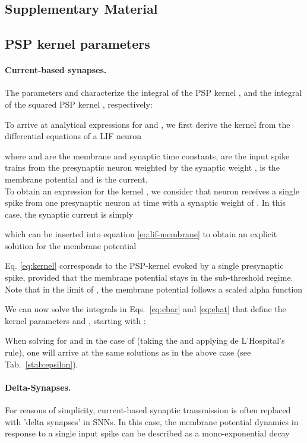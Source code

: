 \documentclass[11pt,a4paper]{article}
\begin{document}
\begin{refsection}
\section*{Supplementary Material}



\subsection{PSP kernel parameters} 
\label{sup:kernel}

\paragraph{Current-based synapses.} 
The parameters  and
 characterize the integral of the \ac{PSP} kernel , and the integral of the squared \ac{PSP} kernel , respectively:
 
To arrive at analytical expressions for  and
, we first derive the kernel  from the differential equations of a \ac{LIF} neuron \citep{Gerstner2002}

where  and  are the membrane and synaptic time constants,  are the input spike trains from the presynaptic neuron  weighted by the synaptic weight ,  is the membrane potential and  is the current.\\
To obtain an expression for the kernel , we consider that neuron
 receives a single spike from one presynaptic neuron  at time  with
a synaptic weight of . In this case, the synaptic current is simply

which can be inserted into equation \eqref{eq:lif-membrane} to obtain an
explicit solution for the membrane potential

Eq. \eqref{eq:kernel} corresponds to the \ac{PSP}-kernel  evoked
by a single presynaptic spike, provided that the membrane potential stays in
the sub-threshold regime. Note that in the limit of
, the membrane potential
follows a scaled alpha function

We can now solve the integrals in Eqs.~\eqref{eq:ebar} and
\eqref{eq:ehat} that define the kernel parameters  and
, starting with :


{\small

}

When solving for  and  in the case of  (taking the  and applying de L’Hospital's rule), one will arrive at the same solutions as in the above case (see Tab.~\ref{stab:epsilon}).

\paragraph{Delta-Synapses.} For reasons of simplicity, current-based synaptic
transmission is often replaced with 'delta synapses' in \acp{SNN}. 
In this case, the membrane potential dynamics in response to a single input
spike can be described as a mono-exponential decay


\end{refsection}
\end{document}
